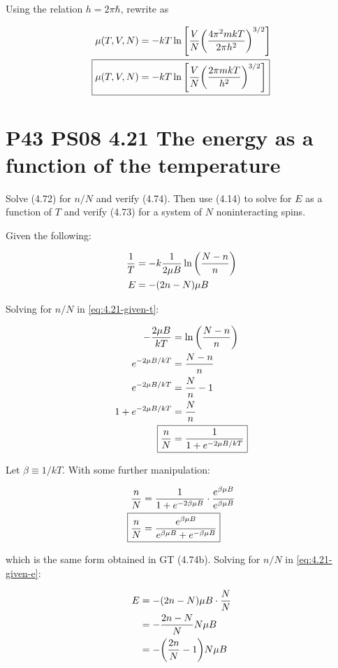 \documentclass[9pt,a4paper,twocolumn]{article}
\begin{document}
Using the relation $h = 2\pi\hbar$, rewrite as

\begin{align}
	\mu(T,V,N) &= -kT\ln\qty[\frac{V}{N}\qty(\frac{4\pi^2 mkT}{2\pi h^2})^{3/2}] \\
	\Aboxed{
		\mu(T,V,N) &= -kT\ln\qty[\frac{V}{N}\qty(\frac{2\pi mkT}{h^2})^{3/2}]
	} \label{eq:4.20-answer-2}
\end{align}

\section{P43 PS08 4.21 The energy as a function of the temperature}
Solve (4.72) for $n/N$ and verify (4.74). Then use (4.14) to solve for $E$ as a function of $T$ and verify (4.73) for a system of $N$ noninteracting spins.

Given the following:

\begin{align}
	\frac{1}{T} &= -k\frac{1}{2\mu B}\ln\qty(\frac{N-n}{n}) \label{eq:4.21-given-t} \\
	E &= -(2n - N)\mu B \label{eq:4.21-given-e}
\end{align}

Solving for $n/N$ in \eqref{eq:4.21-given-t}:

\begin{align}
	-\frac{2\mu B}{kT} &= \ln\qty(\frac{N - n}{n}) \\
	e^{-2\mu B/kT} &= \frac{N-n}{n} \\
	e^{-2\mu B/kT} &= \frac{N}{n} - 1 \\
	1 + e^{-2\mu B/kT} &= \frac{N}{n} \\
	\Aboxed{
		\frac{n}{N} &= \frac{1}{1 + e^{-2\mu B/kT}}
	} \label{eq:4.21-answer-1}
\end{align}

Let $\beta \equiv 1/kT$. With some further manipulation:

\begin{align}
	\frac{n}{N} &= \frac{1}{1 + e^{-2\beta\mu B}} \cdot \frac{e^{\beta\mu B}}{e^{\beta\mu B}} \\
	\Aboxed{
	\frac{n}{N} &= \frac{e^{\beta\mu B}}{e^{\beta\mu B} + e^{-\beta\mu B}}
	} \label{eq:4.21-answer-2}
\end{align}

which is the same form obtained in GT (4.74b). Solving for $n/N$ in \eqref{eq:4.21-given-e}:

\begin{align}
	E &= -(2n - N)\mu B \cdot \frac{N}{N} \\
	&= -\frac{2n - N}{N}N\mu B \\
	&= -\qty(\frac{2n}{N} - 1)N\mu B
\end{align}
\end{document}
